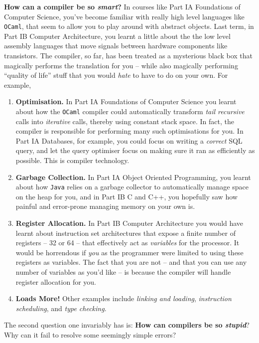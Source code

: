 \textbf{How can a compiler be so \emph{smart}?} In courses like {\sffamily Part IA Foundations of Computer Science}, you've become familiar with really high level languages like \texttt{OCaml}, that seem to allow you to play around with abstract objects. Last term, in {\sffamily Part IB Computer Architecture}, you learnt a little about the the low level assembly languages that move signals between hardware components like transistors. The compiler, so far, has been treated as a mysterious black box that magically performs the translation for you -- while also magically performing ``quality of life'' stuff that you would \emph{hate} to have to do on your own. For example,

\begin{enumerate}
    \item \textbf{Optimisation.} In {\sffamily Part IA Foundations of Computer Science} you learnt about how the \texttt{OCaml} compiler could automatically transform \emph{tail recursive} calls into \emph{iterative} calls, thereby using constant stack space. In fact, the compiler is responsible for performing many such optimisations for you. In {\sffamily Part IA Databases}, for example, you could focus on writing a \emph{correct} SQL query, and let the query optimiser focus on making sure it ran as efficiently as possible. This is compiler technology.
    \item \textbf{Garbage Collection.} In {\sffamily Part IA Object Oriented Programming}, you learnt about how \texttt{Java} relies on a garbage collector to automatically manage space on the heap for you, and in {\sffamily Part IB C and C++}, you hopefully saw how painful and error-prone managing memory on your own is. 
    \item \textbf{Register Allocation.} In {\sffamily Part IB Computer Architecture} you would have learnt about instruction set architectures that expose a finite number of registers -- 32 or 64 -- that effectively act as \emph{variables} for the processor. It would be horrendous if \emph{you} as the programmer were limited to using these registers as variables. The fact that you are not -- and that you can use any number of variables as you'd like -- is because the compiler will handle register allocation for you.
    \item \textbf{Loads More!} Other examples include \emph{linking and loading}, \emph{instruction scheduling}, and \emph{type checking}.
\end{enumerate}

The second question one invariably has is: \textbf{How can compilers be so \emph{stupid}}? Why can it fail to resolve some seemingly simple errors?

